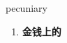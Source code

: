 
\begin{frame}
{\huge pecuniary}
\begin{center}
\begin{enumerate}\Large
  \item \textbf{金钱上的}
\end{enumerate}
\end{center}
\end{frame}
